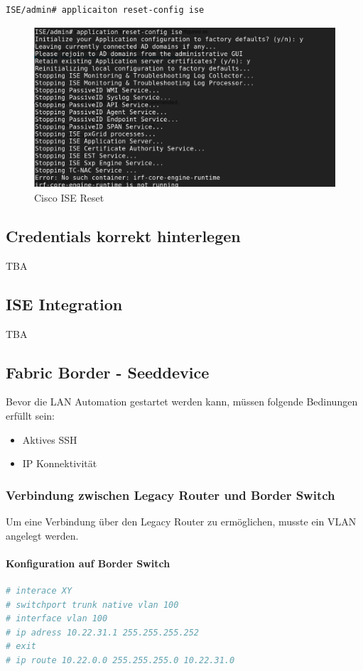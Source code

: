 \begin{lstlisting}[language=bash]
ISE/admin# applicaiton reset-config ise
\end{lstlisting}

\begin{figure}[H]
	\centering
	\includegraphics[height=6cm]{img/secondtry/s2t-cisco-ise-reset.png}
	\caption{Cisco ISE Reset}
	\label{fig:dna-ise-reset-1}
\end{figure}

\subsection{Credentials korrekt hinterlegen}
TBA

\subsection{ISE Integration}
TBA

\subsection{Fabric Border - Seeddevice}
Bevor die LAN Automation gestartet werden kann, müssen folgende Bedinungen erfüllt sein:
\begin{itemize}
	\item Aktives SSH
	\item IP Konnektivität
\end{itemize}

\subsubsection{Verbindung zwischen Legacy Router und Border Switch}
Um eine Verbindung über den Legacy Router zu ermöglichen, musste ein VLAN angelegt werden.

\paragraph{Konfiguration auf Border Switch}
\begin{lstlisting}[language=bash]
# interace XY
# switchport trunk native vlan 100
# interface vlan 100
# ip adress 10.22.31.1 255.255.255.252
# exit
# ip route 10.22.0.0 255.255.255.0 10.22.31.0
\end{lstlisting}

